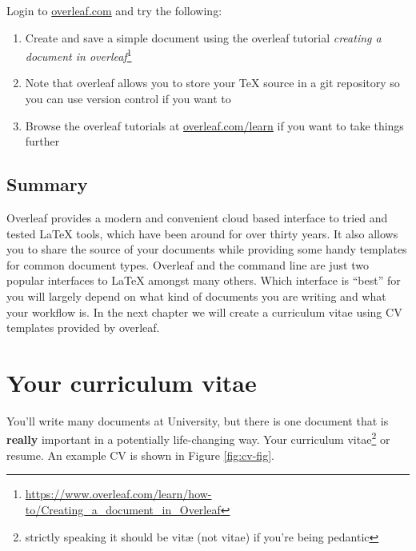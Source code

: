 \documentclass[
]{book}
\providecommand{\tightlist}{%
  \setlength{\itemsep}{0pt}\setlength{\parskip}{0pt}}
\begin{document}
Login to \href{https://www.overleaf.com/}{overleaf.com} and try the following:

\begin{enumerate}
\def\labelenumi{\arabic{enumi}.}
\tightlist
\item
  Create and save a simple document using the overleaf tutorial \emph{creating a document in overleaf}\footnote{\url{https://www.overleaf.com/learn/how-to/Creating_a_document_in_Overleaf}}~\\
\item
  Note that overleaf allows you to store your TeX source in a git repository so you can use version control if you want to
\item
  Browse the overleaf tutorials at \href{https://www.overleaf.com/learn}{overleaf.com/learn} if you want to take things further
\end{enumerate}

\hypertarget{overleafconc}{%
\section{Summary}\label{overleafconc}}

Overleaf provides a modern and convenient cloud based interface to tried and tested LaTeX tools, which have been around for over thirty years. \citep{knuth} It also allows you to share the source of your documents while providing some handy templates for common document types. Overleaf and the command line are just two popular interfaces to LaTeX amongst many others. \citep{latexproject} Which interface is ``best'' for you will largely depend on what kind of documents you are writing and what your workflow is. In the next chapter we will create a curriculum vitae using CV templates provided by overleaf.

\hypertarget{cv}{%
\chapter{Your curriculum vitae}\label{cv}}

You'll write many documents at University, but there is one document that is \textbf{really} important in a potentially life-changing way. Your curriculum vitae\footnote{strictly speaking it should be vitæ (not vitae) if you're being pedantic} or resume. An example CV is shown in Figure \ref{fig:cv-fig}.
\end{document}
